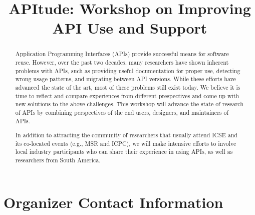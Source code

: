 \documentclass[10pt, conference]{IEEEtran}
\begin{document}
\title{APItude: Workshop on Improving API Use and Support}


\newcommand\tud[0]{\textsuperscript{\normalfont \textdagger}}
\newcommand\iowa[0]{\textsuperscript{\normalfont \textparagraph}}
\newcommand\utd[0]{\textsuperscript{\normalfont \ddag}}
\newcommand\lanu[0]{\textsuperscript{\normalfont \textsection}}
\newcommand\ualberta[0]{\textsuperscript{\normalfont \textasteriskcentered}}

\author{
\and
{}
\and
{}
\and
{}
}


\maketitle


\begin{abstract}
Application Programming Interfaces (APIs) provide successful means for software reuse. However, over the past two decades, many researchers have shown inherent problems with APIs, such as providing useful documentation for proper use, detecting wrong usage patterns, and migrating between API versions. While these efforts have advanced the state of the art, most of these problems still exist today. We believe it is time to reflect and compare experiences from different prespectives and come up with new solutions to the above challenges. This workshop will advance the state of research of APIs by combining perspectives of the end users, designers, and maintainers of APIs.

In addition to attracting the community of researchers that usually attend ICSE and its co-located events (e.g., MSR and ICPC), we will make intensive efforts to involve local industry participants who can share their experience in using APIs, as well as researchers from South America.
\end{abstract}

\section{Organizer Contact Information}
\end{document}
